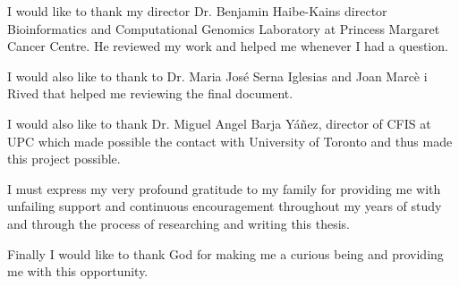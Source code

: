 

I would like to thank my director Dr. Benjamin Haibe-Kains director Bioinformatics and 
Computational Genomics Laboratory at Princess Margaret Cancer 
Centre. He reviewed my work and helped me whenever I had a question.

I would also like to thank to Dr. Maria José Serna Iglesias and Joan Marcè i Rived 
that helped me reviewing the final document.

I would also like to thank Dr. Miguel Angel Barja Yáñez, director of CFIS at UPC which 
made possible the contact with University of Toronto and thus made this project possible.

I must express my very profound gratitude to my family for providing me with unfailing 
support and continuous encouragement throughout my years of study and through the process 
of researching and writing this thesis. 

Finally I would like to thank God for making me a curious being and providing me with 
this opportunity.


